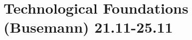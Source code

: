 \documentclass[11pt]{article}
\begin{document}
\section{Technological Foundations (Busemann) 21.11-25.11}
%
%
%
%
%
%
%
%
%
%
%
%
%
%
%
%
%
%
%
%
%
%
%
%
%
%
%
%
%
%
%
%
%
%
%
%
%
%
%
%
%
%
%
%
%
%
%
%
%
%
%
%
%
\end{document}

